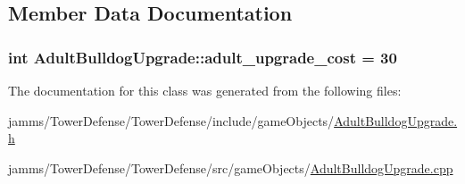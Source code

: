 \subsection{Member Data Documentation}
\hypertarget{class_adult_bulldog_upgrade_ae5315a1ef3b6e4290100e3b9ce03cbb7}{
\subsubsection[{adult\+\_\+upgrade\+\_\+cost}]{\setlength{\rightskip}{0pt plus 5cm}int Adult\+Bulldog\+Upgrade\+::adult\+\_\+upgrade\+\_\+cost = 30\hspace{0.3cm}{\ttfamily [static]}}}\label{class_adult_bulldog_upgrade_ae5315a1ef3b6e4290100e3b9ce03cbb7}


The documentation for this class was generated from the following files\+:\begin{DoxyCompactItemize}
\item 
jamms/\+Tower\+Defense/\+Tower\+Defense/include/game\+Objects/\hyperlink{_adult_bulldog_upgrade_8h}{Adult\+Bulldog\+Upgrade.\+h}\item 
jamms/\+Tower\+Defense/\+Tower\+Defense/src/game\+Objects/\hyperlink{_adult_bulldog_upgrade_8cpp}{Adult\+Bulldog\+Upgrade.\+cpp}\end{DoxyCompactItemize}
